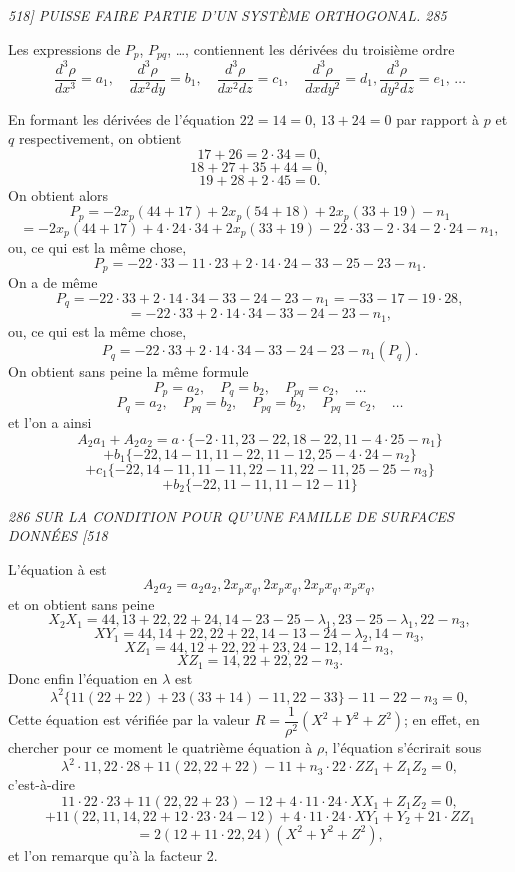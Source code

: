 \documentclass[11pt,a4paper]{book}
\begin{document}
\noindent\textit{518] \hfill PUISSE FAIRE PARTIE D'UN SYST\`EME ORTHOGONAL. \hfill 285}

\medskip

\quad [Pp.~381---385.]

\medskip

Les expressions de $P_p$, $P_{pq}$, \ldots, contiennent les d\'eriv\'ees du troisi\`eme ordre
\[
\frac{d^3 \rho}{dx^3} = a_1, \quad \frac{d^3 \rho}{dx^2 dy} = b_1, \quad \frac{d^3 \rho}{dx^2 dz} = c_1, \quad \frac{d^3 \rho}{dx dy^2} = d_1, \frac{d^3 \rho}{dy^2 dz} = e_1, \, \ldots
\]

En formant les d\'eriv\'ees de l'\'equation $22 = 14 = 0$, $13 + 24 = 0$ par rapport \`a
$p$ et $q$ respectivement, on obtient
\[
17 + 26 = 2 \cdot 34 = 0,
\]
\[
18 + 27 + 35 + 44 = 0,
\]
\[
19 + 28 + 2 \cdot 45 = 0.
\]
On obtient alors
\[
P_p = -2x_p (44 + 17) + 2x_p (54 + 18) + 2x_p (33 + 19) - n_1
\]
\[
= -2x_p (44 + 17) + 4 \cdot 24 \cdot 34 + 2x_p (33 + 19) - 22 \cdot 33 - 2 \cdot 34 - 2 \cdot 24 - n_1,
\]
ou, ce qui est la m\^eme chose,
\[
P_p = -22 \cdot 33 - 11 \cdot 23 + 2 \cdot 14 \cdot 24 - 33 - 25 - 23 - n_1.
\]
On a de m\^eme
\[
P_q = -22 \cdot 33 + 2 \cdot 14 \cdot 34 - 33 - 24 - 23 - n_1 = - 33 - 17 - 19 \cdot 28,
\]
\[
= -22 \cdot 33 + 2 \cdot 14 \cdot 34 - 33 - 24 - 23 - n_1,
\]
ou, ce qui est la m\^eme chose,
\[
P_q = -22 \cdot 33 + 2 \cdot 14 \cdot 34 - 33 - 24 - 23 - n_1 (P_q).
\]
On obtient sans peine la m\^eme formule
\[
P_p = a_2, \quad P_q = b_2, \quad P_{pq} = c_2, \quad \ldots
\]
\[
P_q = a_2, \quad P_{pq} = b_2, \quad P_{pq} = b_2, \quad P_{pq} = c_2, \quad \ldots
\]
et l'on a ainsi
\[
A_2 a_1 + A_2 a_2 = a \cdot \{-2 \cdot 11, 23 - 22, 18 - 22, 11 - 4 \cdot 25 - n_1\}
\]
\[
+ b_1\{- 22, 14 - 11, 11 - 22, 11 - 12, 25 - 4 \cdot 24 - n_2\}
\]
\[
+ c_1\{- 22, 14 - 11, 11 - 11, 22 - 11, 22 - 11, 25 - 25 - n_3\}
\]
\[
+ b_2\{- 22, 11 - 11, 11 - 12 - 11\}
\]

\clearpage

\noindent\textit{286 \hfill SUR LA CONDITION POUR QU'UNE FAMILLE DE SURFACES DONN\'EES \hfill [518}

\medskip

L'\'equation \`a est
\[
A_2 a_2 = a_2 a_2, 2x_p x_q, 2 x_p x_q, 2 x_p x_q, x_p x_q,
\]
et on obtient sans peine
\[
X_2 X_1 = 44, 13 + 22, 22 + 24, 14 - 23 - 25 - \lambda_1, 23 - 25 - \lambda_1, 22 - n_3,
\]
\[
XY_1 = 44, 14 + 22, 22 + 22, 14 - 13 - 24 - \lambda_2, 14 - n_3,
\]
\[
XZ_1 = 44, 12 + 22, 22 + 23, 24 - 12, 14 - n_3,
\]
\[
XZ_1 = 14, 22 + 22, 22 - n_3.
\]
Donc enfin l'\'equation en $\lambda$ est
\[
\lambda^2 \{11(22 + 22) + 23(33 + 14) - 11, 22 - 33\} - 11 - 22 - n_3 = 0,
\]
Cette \'equation est v\'erifi\'ee par la valeur $R = \dfrac{1}{\rho^2}(X^2 + Y^2 + Z^2)$; en effet, en
chercher pour ce moment le quatri\`eme \'equation \`a $\rho$, l'\'equation s'\'ecrirait sous
\[
\lambda^2 \cdot 11, 22 \cdot 28 + 11(22, 22 + 22) - 11 + n_3 \cdot 22 \cdot ZZ_1 + Z_1 Z_2 = 0,
\]
c'est-\`a-dire
\[
11 \cdot 22 \cdot 23 + 11(22, 22 + 23) - 12 + 4 \cdot 11 \cdot 24 \cdot XX_1 + Z_1 Z_2 = 0,
\]
\[
+ 11(22, 11, 14, 22 + 12 \cdot 23 \cdot 24 - 12) + 4 \cdot 11 \cdot 24 \cdot XY_1 + Y_2 + 21 \cdot ZZ_1
\]
\[
= 2(12 + 11 \cdot 22, 24)(X^2 + Y^2 + Z^2),
\]
et l'on remarque qu'\`a la facteur 2.
\end{document}
